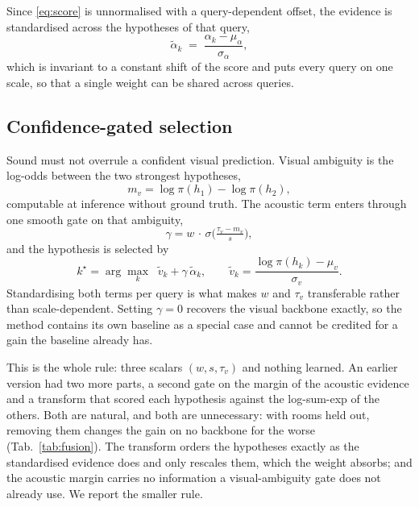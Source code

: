 Since \eqref{eq:score} is unnormalised with a query-dependent offset, the
evidence is standardised across the hypotheses of that query,
%
\begin{equation}
  \tilde{\alpha}_k \;=\; \frac{\alpha_k - \mu_\alpha}{\sigma_\alpha},
  \label{eq:evidence}
\end{equation}
%
which is invariant to a constant shift of the score and puts every query on
one scale, so that a single weight can be shared across queries.

\subsection{Confidence-gated selection}
\label{sec:gate}

Sound must not overrule a confident visual prediction. Visual ambiguity is the
log-odds between the two strongest hypotheses,
%
\begin{equation}
  m_v = \log \pi(h_{1}) - \log \pi(h_{2}),
  \label{eq:margins}
\end{equation}
%
computable at inference without ground truth. The acoustic term enters through
one smooth gate on that ambiguity,
%
\begin{equation}
  \gamma = w \,\cdot\, \sigma\!\Big(\tfrac{\tau_v - m_v}{s}\Big),
  \label{eq:gamma}
\end{equation}
%
and the hypothesis is selected by
%
\begin{equation}
  k^\star = \arg\max_k \;\; \tilde{v}_k + \gamma \, \tilde{\alpha}_k ,
  \qquad
  \tilde{v}_k = \frac{\log \pi(h_k) - \mu_v}{\sigma_v}.
  \label{eq:select}
\end{equation}
%
Standardising both terms per query is what makes $w$ and $\tau_v$
transferable rather than scale-dependent. Setting $\gamma{=}0$ recovers the
visual backbone exactly, so the method contains its own baseline as a special
case and cannot be credited for a gain the baseline already has.

This is the whole rule: three scalars $(w, s, \tau_v)$ and nothing learned. An
earlier version had two more parts, a second gate on the margin of the
acoustic evidence and a transform that scored each hypothesis against the
log-sum-exp of the others. Both are natural, and both are unnecessary: with
rooms held out, removing them changes the gain on no backbone for the worse
(Tab.~\ref{tab:fusion}). The transform orders the hypotheses exactly as the
standardised evidence does and only rescales them, which the weight absorbs;
and the acoustic margin carries no information a visual-ambiguity gate does
not already use. We report the smaller rule.


